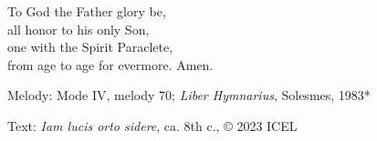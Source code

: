 \hymn



\begin{underhymnverse}
To God the Father glory be,\\
all honor to his only Son,\\
one with the Spirit Paraclete,\\
from age to age for evermore. Amen.
\end{underhymnverse}

\begin{hymnsource}
Melody: Mode IV, melody 70; \emph{Liber Hymnarius}, Solesmes, 1983*

Text: \emph{Iam lucis orto sidere}, ca. 8th c., © 2023 ICEL
\end{hymnsource}
